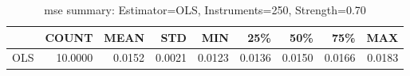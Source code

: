 \begin{table}[ht]
\centering
\caption{mse summary: Estimator=OLS, Instruments=250, Strength=0.70}
\begin{tabular}{lrrrrrrrr}
\toprule
 & COUNT & MEAN & STD & MIN & 25\% & 50\% & 75\% & MAX \\
\midrule
OLS & 10.0000 & 0.0152 & 0.0021 & 0.0123 & 0.0136 & 0.0150 & 0.0166 & 0.0183 \\
\bottomrule
\end{tabular}
\end{table}

